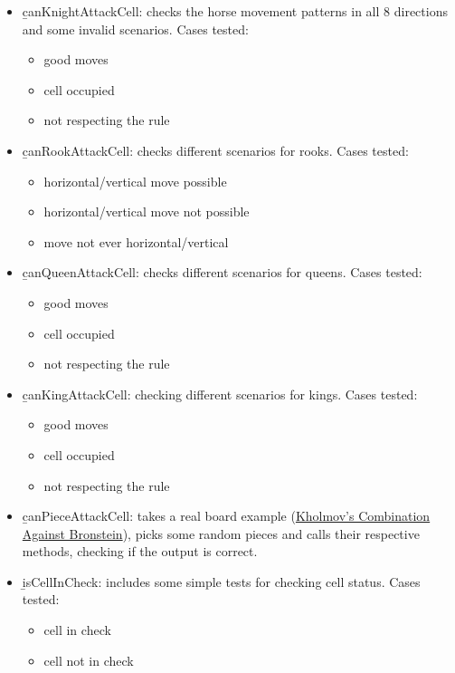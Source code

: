 \begin{itemize}
    \item \b{canKnightAttackCell}: checks the horse movement patterns in all 8 directions and some invalid scenarios. Cases tested:
    \begin{itemize}
        \item good moves
        \item cell occupied
        \item not respecting the rule
    \end{itemize}

    \item \b{canRookAttackCell}: checks different scenarios for rooks. Cases tested:
    \begin{itemize}
        \item horizontal/vertical move possible
        \item horizontal/vertical move not possible
        \item move not ever horizontal/vertical
    \end{itemize}

    \item \b{canQueenAttackCell}: checks different scenarios for queens. Cases tested:
    \begin{itemize}
        \item good moves
        \item cell occupied
        \item not respecting the rule
    \end{itemize}

    \item \b{canKingAttackCell}: checking different scenarios for kings. Cases tested:
    \begin{itemize}
        \item good moves
        \item cell occupied
        \item not respecting the rule
    \end{itemize}

    \item \b{canPieceAttackCell}: takes a real board example (\href{https://www.chess.com/article/view/best-chess-moves#kholmov}{Kholmov's Combination Against Bronstein}), picks some random pieces and calls their respective methods, checking if the output is correct.
    
    \item \b{isCellInCheck}: includes some simple tests for checking cell status. Cases tested:
    \begin{itemize}
        \item cell in check
        \item cell not in check
    \end{itemize}


\end{itemize}
